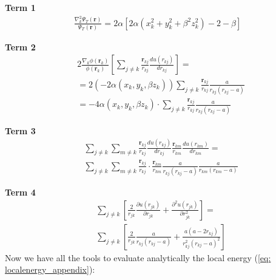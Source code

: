 \textbf{Term 1}
\begin{align*}
    \frac{ \nabla_k^2 \Psi_T(\mathbf{r})}{\Psi_T(\mathbf{r})} = 2 \alpha \left[  2 \alpha (x_k^2 + y_k^2 + \beta^2 z_k^2 ) -2 -\beta \right]
\end{align*}

\textbf{Term 2}
\begin{align*}
    &2 \frac{\nabla_k \phi(\mathbf{r}_k)}{\phi(\mathbf{r}_k)} \left[ \sum_{j\neq k}  \frac{\mathbf{r}_{kj}}{r_{kj}} \frac{du(r_{kj})}{dr_{kj}} \right] = \\
    &=2 \left( -2 \alpha \left( x_k, y_k, \beta z_k \right) \right) \sum_{j\neq k}  \frac{\mathbf{r}_{kj}}{r_{kj}} \frac{a}{r_{kj} \left( r_{kj} - a \right)} \\
    &= -4 \alpha \left( x_k, y_k, \beta z_k \right) \cdot \sum_{j\neq k}  \frac{\mathbf{r}_{kj}}{r_{kj}} \frac{a}{r_{kj} \left( r_{kj} - a \right)} 
\end{align*}


\textbf{Term 3}
\begin{align*}
    &\sum_{j\neq k} \sum_{m \neq k} \frac{\mathbf{r}_{kj}}{r_{kj}} \frac{du(r_{kj})}{dr_{kj}} \frac{\mathbf{r}_{km}}{r_{km}} \frac{du(r_{km})}{dr_{km}} = \\&
    \sum_{j\neq k} \sum_{m \neq k} \frac{\mathbf{r}_{kj}}{r_{kj}} \cdot  \frac{\mathbf{r}_{km}}{r_{km}} \frac{a}{r_{kj} \left( r_{kj} - a \right)} \frac{a}{r_{km} \left( r_{km} - a \right)} 
\end{align*}


\textbf{Term 4}
\begin{align*}
    &\sum_{j\neq k} \left[ \frac{2}{r_{jk}} \frac{\partial u(r_{jk})}{\partial r_{jk}} + \frac{\partial^2 u(r_{jk})}{\partial r_{jk}^2} \right] = \\&\sum_{j\neq k} \left[ \frac{2}{r_{jk}} \frac{a}{r_{kj} \left( r_{kj} - a \right)} + \frac{a \left(a - 2 r_{kj} \right) }{r_{kj}^2 \left( r_{kj} - a \right)^2 } \right]
\end{align*}
Now we have all the tools to evaluate analytically the local energy (\ref{eq: localenergy_appendix}):


